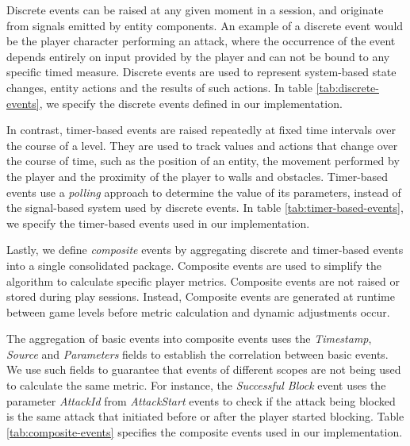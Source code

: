 Discrete events can be raised at any given moment in a session, and originate from signals emitted by entity components. An example of a discrete event would be the player character performing an attack, where the occurrence of the event depends entirely on input provided by the player and can not be bound to any specific timed measure. Discrete events are used to represent system-based state changes, entity actions and the results of such actions. In table \ref{tab:discrete-events}, we specify the discrete events defined in our implementation.



In contrast, timer-based events are raised repeatedly at fixed time intervals over the course of a level. They are used to track values and actions that change over the course of time, such as the position of an entity, the movement performed by the player and the proximity of the player to walls and obstacles. Timer-based events use a \emph{polling} approach to determine the value of its parameters, instead of the signal-based system used by discrete events. In table \ref{tab:timer-based-events}, we specify the timer-based events used in our implementation.



Lastly, we define \emph{composite} events by aggregating discrete and timer-based events into a single consolidated package. Composite events are used to simplify the algorithm to calculate specific player metrics. Composite events are not raised or stored during play sessions. Instead, Composite events are generated at runtime between game levels before metric calculation and dynamic adjustments occur.

The aggregation of basic events into composite events uses the \emph{Timestamp}, \emph{Source} and \emph{Parameters} fields to establish the correlation between basic events. We use such fields to guarantee that events of different scopes are not being used to calculate the same metric. For instance, the \emph{Successful Block} event uses the parameter \emph{AttackId} from \emph{AttackStart} events to check if the attack being blocked is the same attack that initiated before or after the player started blocking. Table \ref{tab:composite-events} specifies the composite events used in our implementation. 


